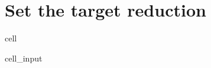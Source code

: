 \documentclass[letterpaper,10pt,english]{jupyterBook}
\begin{document}
\section{Set the target reduction}
\label{\detokenize{content/howto/targetinstruments/One target one instrument with 3 instrument variables:set-the-target-reduction}}
\begin{sphinxuseclass}{cell}\begin{sphinxVerbatimInput}

\begin{sphinxuseclass}{cell_input}
\begin{sphinxVerbatim}[commandchars=\\\{\}]
     
\end{sphinxVerbatim}

\end{sphinxuseclass}\end{sphinxVerbatimInput}

\end{sphinxuseclass}
\end{document}
